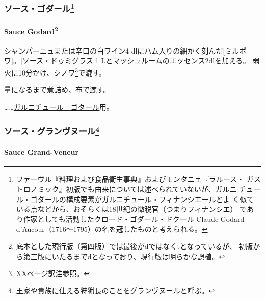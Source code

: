 \begin{recette}
\maeaki

\hypertarget{ux30bdux30fcux30b9ux30b4ux30c0ux30fcux30eb37}{%
\subsubsection[ソース・ゴダール]{\texorpdfstring{ソース・ゴダール\footnote{ファーヴル『料理および食品衛生事典』およびモンタニェ『ラルース・
  ガストロノミック』初版でも由来については述べられていないが、ガルニ
  チュール・ゴダールの構成要素がガルニチュール・フィナンシエールとよ
  く似ている点などから、おそらくは18世紀の徴税官（つまりフィナンシエ）
  であり作家としても活動したクロード・ゴダール・ドクール Claude Godard
  d'Aucour（1716〜1795）の名を冠したものと考えられる。}}{ソース・ゴダール}}\label{ux30bdux30fcux30b9ux30b4ux30c0ux30fcux30eb37}}

\hypertarget{sauce-godard}{%
\paragraph[Sauce Godard]{\texorpdfstring{Sauce Godard\footnote{底本とした現行版（第四版）では最後がdではなくtとなっているが、
  初版から第三版にいたるまでdとなっており、現行版は明らかな誤植。}}{Sauce Godard}}\label{sauce-godard}}

  

シャンパーニュまたは辛口の白ワイン4 dlにハム入りの細かく刻んだ{[}ミルポ
ワ{]}。{[}ソース・ドゥミグラス{]}1
Lとマッシュルームのエッセンス2dlを加える。
弱火に10分かけ、シノワ\footnote{XXページ訳注参照。}で漉す。

\deuxtiers{}量になるまで煮詰め、布で漉す。

\ldots{}\ldots{}\href{}{ガルニチュール　ゴタール}用。

\maeaki

\hypertarget{ux30bdux30fcux30b9ux30b0ux30e9ux30f3ux30f4ux30ccux30fcux30eb40}{%
\subsubsection[ソース・グランヴヌール]{\texorpdfstring{ソース・グランヴヌール\footnote{王家や貴族に仕える狩猟長のことをグランヴヌールと呼ぶ。}}{ソース・グランヴヌール}}\label{ux30bdux30fcux30b9ux30b0ux30e9ux30f3ux30f4ux30ccux30fcux30eb40}}

\hypertarget{sauce-grand-veneur}{%
\paragraph{Sauce Grand-Veneur}\label{sauce-grand-veneur}}


\end{recette}
